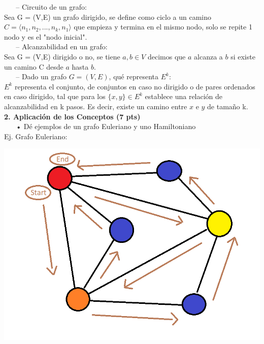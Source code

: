 \documentclass[a4paper,12pt]{article}
\begin{document}
$ ~~~~~~ $ – Circuito de un grafo: \\

Sea G = (V,E) un grafo dirigido, se define como ciclo a un camino $C = \langle n_1,n_2, ..., n_k, n_1\rangle$ que empieza y termina en el mismo nodo, solo se repite 1 nodo y es el "nodo inicial". \\

$ ~~~~~~ $ – Alcanzabilidad en un grafo: \\

Sea G = (V,E) dirigido o no, se tiene $a,b \in V$ decimos que $a$ alcanza a $b$ si existe un camino C desde $a$ hasta $b$. \\

$ ~~~~~~ $ – Dado un grafo $G = (V,E)$, qué representa $E^k$: \\

$E^k$ representa el conjunto, de conjuntos en caso no dirigido o de pares ordenados en caso dirigido, tal que para los $\{x,y\} \in E^k$ establece una relación de alcanzabilidad en k pasos. Es decir, existe un camino entre $x$ e $y$ de tamaño k. \\

\textbf{2. Aplicación de los Conceptos (7 pts)} \\

$ ~~~~~~ $ • Dé ejemplos de un grafo Euleriano y uno Hamiltoniano\\

Ej. Grafo Euleriano:  \\

\begin{center}
\par \includegraphics[scale=0.8]{grafoeuleriano} \par
\end{center} 
\end{document}
